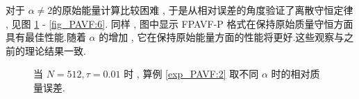   对于 $\alpha\neq 2$的原始能量计算比较困难 , 于是从相对误差的角度验证了离散守恒定律 , 见图 \ref{fig_PAVF:5} - \ref{fig_PAVF:6}.
  同样 , 图中显示 FPAVF-P 格式在保持原始质量守恒方面具有最佳性能.随着 $\alpha$ 的增加 , 它在保持原始能量方面的性能将更好.这些观察与之前的理论结果一致.

  \begin{figure}[H]
	\begin{center}
	\caption{当 $N = 512 , \tau=0.01$ 时 , 算例 \ref{exp_PAVF:2} 取不同 $\alpha$ 时的相对质量误差.}
	\label{fig_PAVF:5}
	\end{center}
	\end{figure}
	
